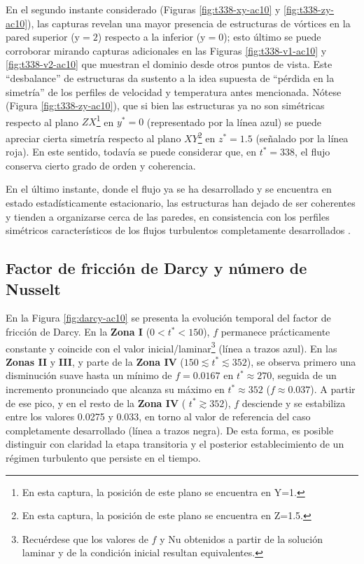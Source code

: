 En el segundo instante considerado (Figuras \ref{fig:t338-xy-ac10} y \ref{fig:t338-zy-ac10}), las capturas revelan una mayor presencia de estructuras de vórtices en la pared superior ($\text{y}=2$) respecto a la inferior ($\text{y}=0$); esto último se puede corroborar mirando capturas adicionales en las Figuras \ref{fig:t338-v1-ac10} y \ref{fig:t338-v2-ac10} que muestran el dominio desde otros puntos de vista. Este ``desbalance'' de estructuras da sustento a la idea supuesta de ``pérdida en la simetría'' de los perfiles de velocidad y temperatura antes mencionada. Nótese (Figura \ref{fig:t338-zy-ac10}), que si bien las estructuras ya no son simétricas respecto al plano $ZX$\footnote{En esta captura, la posición de este plano se encuentra en Y=1.} en $y^*=0$ (representado por la línea azul) se puede apreciar cierta simetría respecto al plano $XY$\footnote{En esta captura, la posición de este plano se encuentra en Z=1.5.} en $z^*= 1 \text{.} 5$ (señalado por la línea roja). En este sentido, todavía se puede considerar que, en $t^* = 338$, el flujo conserva cierto grado de orden y coherencia. 


En el último instante, donde el flujo ya se ha desarrollado y se encuentra en estado estadísticamente estacionario, las estructuras han dejado de ser coherentes y tienden a organizarse cerca de las paredes, en consistencia con los perfiles simétricos característicos de los flujos turbulentos completamente desarrollados \cite{machaca2024}.

\subsection{Factor de fricción de Darcy y número de Nusselt}
En la Figura \ref{fig:darcy-ac10} se presenta la evolución temporal del factor de fricción de Darcy. En la \textbf{Zona I} ($0 < t^* < 150$), $f$ permanece prácticamente constante y coincide con el \linebreak valor inicial/laminar\footnote{Recuérdese que los valores de $f$ y Nu obtenidos a partir de la solución laminar y de la condición inicial resultan equivalentes.} (línea a trazos azul). En las \textbf{Zonas II} y \textbf{III}, y parte de la \textbf{Zona IV} ($150 \lesssim t^* \lesssim 352 $), se observa primero una disminución suave hasta un mínimo de $f=0\text{.}0167$ en $t^*\approx270$, seguida de un incremento pronunciado que alcanza su máximo en $t^*\approx352$ ($f \approx 0\text{.}037$). A partir de ese pico, y en el resto de la \textbf{Zona IV} ( $t^*\gtrsim352$), $f$ desciende y se estabiliza entre los valores 0.0275 y 0.033, en torno al valor de referencia del caso completamente desarrollado (línea a trazos negra). De esta forma, es posible distinguir con claridad la etapa transitoria y el posterior establecimiento de un régimen turbulento que persiste en el tiempo.

